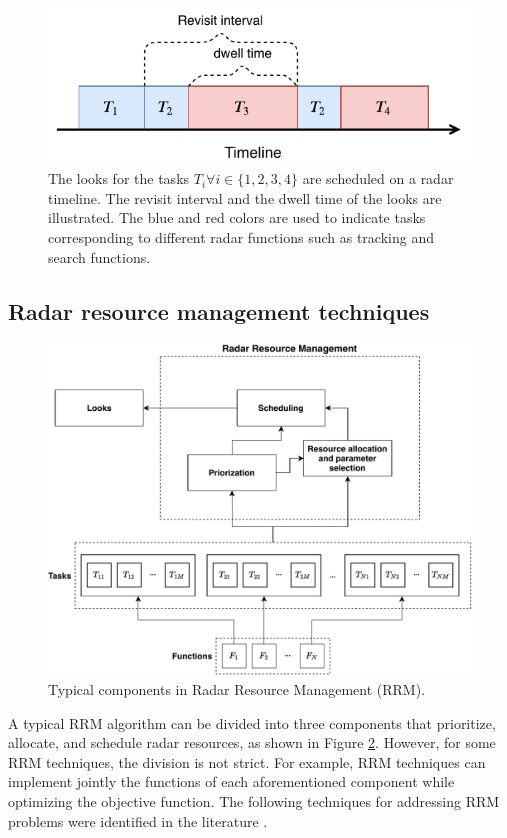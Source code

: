 \documentclass[english, 12pt, a4paper, elec, utf8, a-1b, online]{aaltothesis}
\begin{document}
\begin{figure}[h]
    \centering
    \includegraphics{figures/timeline.pdf}
    \caption{
        The looks for the tasks $T_i \forall i\in\{1,2,3,4\}$ are scheduled on a radar timeline. 
        The revisit interval and the dwell time of the looks are illustrated.
        The blue and red colors are used to indicate tasks corresponding to different radar functions such as tracking and search functions.
    }
    \label{fig:timeline}
\end{figure}

\subsection{Radar resource management techniques} \label{sec:RRM_tech}

\begin{figure}[tb]
    \centering
    \includegraphics[width=.9\linewidth]{figures/RRM_diagram.pdf}
    \caption{Typical components in Radar Resource Management (RRM).}
    \label{fig:RRM_diagram}
\end{figure}

A typical RRM algorithm can be divided into three components that prioritize, allocate, and schedule radar resources, as shown in Figure \ref{fig:RRM_diagram}.
However, for some RRM techniques, the division is not strict.
For example, RRM techniques can implement jointly the functions of each aforementioned component while optimizing the objective function.
The following techniques for addressing RRM problems were identified in the literature \cite{Moo2016, Koch1999, Krishnamurthy2001, Wintenby2006, LaScala2006, Rajkumar1997, Rajkumar1998, Kastella1997, Kreucher2004, Kreucher2005, Xu2010}.
\end{document}
